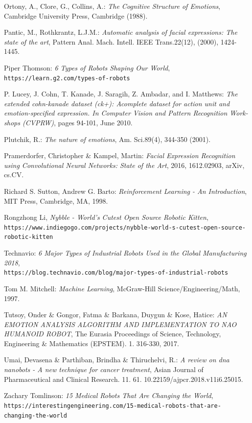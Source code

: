 \documentclass[runningheads,a4paper,12pt]{report}
\begin{document}
\begin{thebibliography}{9}
Ortony, A., Clore, G., Collins, A.: 
\textit{The Cognitive Structure of Emotions}, Cambridge University Press, Cambridge (1988).

Pantic, M., Rothkrantz, L.J.M.: 
\textit{Automatic analysis of facial expressions: The state of the art}, 
Pattern Anal. Mach. Intell. IEEE Trans.22(12), (2000), 1424-1445.

Piper Thomson:
\textit{6 Types of Robots Shaping Our World},
\texttt{https://learn.g2.com/types-of-robots}

P. Lucey, J. Cohn, T. Kanade, J. Saragih, Z. Ambadar, and I. Matthews:
\textit{The extended cohn-kanade dataset (ck+): Acomplete dataset for action unit and emotion-specified expression. In Computer Vision and Pattern Recognition Work-shops (CVPRW)}, pages 94-101, June 2010.

Plutchik, R.: 
\textit{The nature of emotions}, 
Am. Sci.89(4), 344-350 (2001).

Pramerdorfer, Christopher \& Kampel, Martin:
\textit{Facial Expression Recognition using Convolutional Neural Networks: State of the Art}, 2016, 1612.02903, arXiv, cs.CV. 

 Richard S. Sutton, Andrew G. Barto:
\textit{Reinforcement Learning - An Introduction},
MIT Press,
Cambridge, MA,
1998.

Rongzhong Li,
\textit{Nybble - World's Cutest Open Source Robotic Kitten},
\texttt{https://www.indiegogo.com/projects/nybble-world-s-cutest-open-source-robotic-kitten}

Technavio:
\textit{6 Major Types of Industrial Robots Used in the Global Manufacturing 2018}, 
\\\texttt{https://blog.technavio.com/blog/major-types-of-industrial-robots}

Tom M. Mitchell: 
\textit{Machine Learning},
McGraw-Hill Science/Engineering/Math,
1997.

Tutsoy, Onder \& Gongor, Fatma \& Barkana, Duygun \& Kose, Hatice:
\textit{AN EMOTION ANALYSIS ALGORITHM AND IMPLEMENTATION TO NAO HUMANOID ROBOT}, 
The Eurasia Proceedings of Science, Technology, Engineering \& Mathematics (EPSTEM). 1. 316-330, 2017. 

Umai, Devasena \& Parthiban, Brindha \& Thiruchelvi, R.:
\textit{A review on dna nanobots - A new technique for cancer treatment},
Asian Journal of Pharmaceutical and Clinical Research. 11. 61. 10.22159/ajpcr.2018.v11i6.25015. 

Zachary Tomlinson:
\textit{15 Medical Robots That Are Changing the World},
\texttt{https://interestingengineering.com/15-medical-robots-that-are-changing-the-world}

\end{thebibliography}
\end{document}
